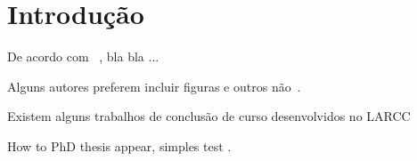 \chapter*{Introdução} \label{chap:intro}




\lipsum[2-4]

\cite{larcc}


De acordo com ~\cite{larcc:intra-cloud_networking_cloudstack:PDP:17}, bla bla ...


Alguns autores preferem incluir figuras e outros não~\citep{larcc:parsec_cloudstack_lxc_kvm:ISCC:2018}.


Existem alguns trabalhos de conclusão de curso desenvolvidos no LARCC~\citep{larcc:dinei_nadine:TCC:17,larcc:anderson_willian:TCC:17,larcc:bruna_eduardo:TCC:13,larcc:charles_stein:TCC:18}



How to PhD thesis appear, simples test \citep{GRIEBLER:PHD:16}.

